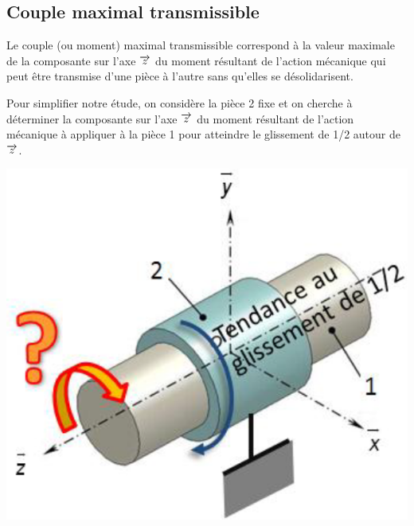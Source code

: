 \documentclass[10pt]{article}
\begin{document}
\subsection*{Couple maximal transmissible}

\begin{minipage}[c]{.55\linewidth}
Le couple (ou moment) maximal transmissible correspond à la valeur maximale 
de la composante sur l’axe $\overrightarrow{z}$ du moment résultant de l’action mécanique qui peut 
être transmise d’une pièce à l’autre sans qu’elles se désolidarisent. 
 
Pour simplifier notre étude, on considère la pièce 2 fixe et on cherche à 
déterminer la composante sur l’axe $\overrightarrow{z}$ du moment résultant de l’action mécanique 
à appliquer à la pièce 1 pour atteindre le glissement de 1/2 autour de $\overrightarrow{z}$.
 
\end{minipage}\hfill
\begin{minipage}[c]{.4\linewidth}
\begin{center}
\includegraphics[width=.9\textwidth]{images/fig_04}
\end{center}
\end{minipage}
\end{document}
